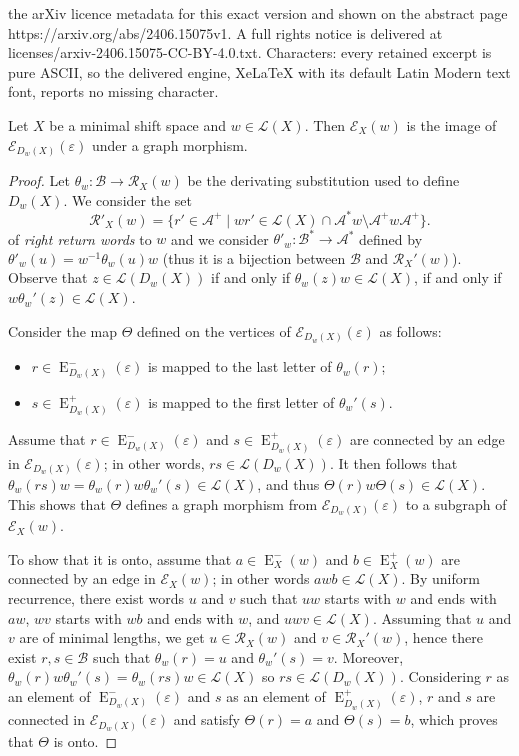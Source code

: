 \documentclass[10pt,a4paper]{amsart}
\newcommand*{\ExtGraph}{\mathcal{E}}
\newcommand*{\LExt}{\operatorname{E}^-}
\newcommand*{\RExt}{\operatorname{E}^+}
\newcommand*{\cA}{\mathcal{A}}
\newcommand*{\cB}{\mathcal{B}}
\newcommand*{\emptyw}{\varepsilon}
\newcommand*{\from}{\colon}
\newcommand*{\lang}{\mathcal{L}}
\newcommand*{\ret}{\mathcal{R}}
\begin{document}
the arXiv licence metadata for this exact version and shown on the abstract page https://arxiv.org/abs/2406.15075v1. A full rights notice is delivered at licenses/arxiv-2406.15075-CC-BY-4.0.txt. Characters: every retained excerpt is pure ASCII, so the delivered engine, XeLaTeX with its default Latin Modern text font, reports no missing character.
\begin{lemma}\label{L:isomorphism generalized extension graph}
    Let $X$ be a minimal shift space and $w \in \lang(X)$. Then $\ExtGraph_X(w)$ is the image of $\ExtGraph_{D_w(X)}(\varepsilon)$ under a graph morphism.
\end{lemma}

\begin{proof}
    Let $\theta_w\from \cB\to\ret_X(w)$ be the derivating substitution used to define $D_w(X)$. We consider the set 
    \[
        \ret'_X(w) = \{r' \in \cA^+ \mid wr'\in \lang(X)\cap \cA^*w\setminus \cA^+w\cA^+\}.
    \]
    of \emph{right return words} to $w$ and we consider $\theta'_w\from \cB^* \to \cA^*$ defined by $\theta'_w(u) = w^{-1}\theta_w(u)w$ (thus it is a bijection between $\cB$ and $\ret_X'(w)$). Observe that $z\in\lang(D_w(X))$ if and only if $\theta_w(z)w\in\lang(X)$, if and only if $w\theta_w'(z)\in\lang(X)$.
    
    Consider the map $\Theta$ defined on the vertices of $\ExtGraph_{D_w(X)}(\varepsilon)$ as follows:
    \begin{itemize}
        \item $r\in\LExt_{D_w(X)}(\varepsilon)$ is mapped to the last letter of $\theta_w(r)$;
        \item $s\in\RExt_{D_w(X)}(\varepsilon)$ is mapped to the first letter of $\theta_w'(s)$.
    \end{itemize}
    Assume that $r\in \LExt_{D_w(X)}(\emptyw)$ and $s\in \RExt_{D_w(X)}(\emptyw)$ are connected by an edge in $\ExtGraph_{D_w(X)}(\emptyw)$; in other words, $rs\in\lang(D_w(X))$. It then follows that $\theta_w(rs)w = \theta_w(r)w\theta_w'(s)\in\lang(X)$, and thus $\Theta(r)w\Theta(s)\in\lang(X)$. This shows that $\Theta$ defines a graph morphism from $\ExtGraph_{D_w(X)}(\emptyw)$ to a subgraph of $\ExtGraph_X(w)$. 
    
    To show that it is onto, assume that $a\in\LExt_X(w)$ and $b\in\RExt_X(w)$ are connected by an edge in $\ExtGraph_{X}(w)$; in other words $awb\in\lang(X)$. By uniform recurrence, there exist words $u$ and $v$ such that $uw$ starts with $w$ and ends with $aw$, $wv$ starts with $wb$ and ends with $w$, and $uwv\in\lang(X)$. Assuming that $u$ and $v$ are of minimal lengths, we get $u\in\ret_X(w)$ and $v\in\ret_X'(w)$, hence there exist $r,s\in\cB$ such that $\theta_w(r)=u$ and $\theta_w'(s)=v$. Moreover, $\theta_w(r)w\theta_w'(s) = \theta_w(rs)w \in \lang(X)$ so $rs \in \lang(D_w(X))$. Considering $r$ as an element of $\LExt_{D_w(X)}(\emptyw)$ and $s$ as an element of $\RExt_{D_w(X)}(\emptyw)$, $r$ and $s$ are connected in $\ExtGraph_{D_w(X)}(\emptyw)$ and satisfy $\Theta(r)=a$ and $\Theta(s)=b$, which proves that $\Theta$ is onto.
\end{proof}
\end{document}
